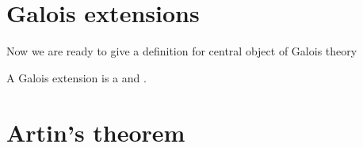 \section{Galois extensions}

Now we are ready to give a definition for central object of Galois
theory

\begin{definition}
  A Galois extension is a  and
  .
  \label{def:galoisextension}
\end{definition}

\section{Artin's theorem}
